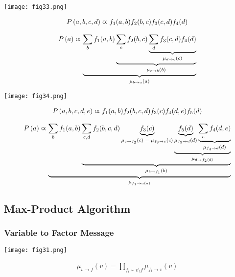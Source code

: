 \begin{minipage}{0.4\textwidth}
	\centering
	\texttt{[image: fig33.png]}
\end{minipage}
\begin{minipage}{0.6\textwidth}
	\begin{align*}
	P\left(a,b,c,d\right)\varpropto f_1(a,b)f_2(b,c)f_3(c,d)f_4(d)
	\end{align*}
\end{minipage}

\begin{align*}
P\left(a\right)\varpropto\underbrace{\sum_bf_1(a,b)\underbrace{\sum_cf_2(b,c)\underbrace{\sum_df_3(c,d)f_4(d)}_\text{$\mu_{d\to c}(c)$}}_\text{$\mu_{c\to b}(b)$}}_\text{$\mu_{b\to a}(a)$}
\end{align*}

\begin{minipage}{0.4\textwidth}
	\centering
	\texttt{[image: fig34.png]}
\end{minipage}
\begin{minipage}{0.6\textwidth}
	\begin{align*}
	P\left(a,b,c,d,e\right)\varpropto f_1(a,b)f_2(b,c,d)f_3(c)f_4(d,e)f_5(d)
	\end{align*}
\end{minipage}

\begin{align*}
P\left(a\right)\varpropto\underbrace{\sum_bf_1(a,b)\underbrace{\sum_{c,d}f_2(b,c,d)\underbrace{f_3(c)}_\text{$\mu_{c\to f_2}(c)=\mu_{f_3\to c}(c)$}\underbrace{\underbrace{f_5(d)}_\text{$\mu_{f_5\to d}(d)$}\underbrace{\sum_ef_4(d,e)}_\text{$\mu_{f_4\to d}(d)$}}_\text{$\mu_{d\to f_2(d)}$}}_\text{$\mu_{b\to f_1}(b)$}}_\text{$\mu_{f_1\to a(a)}$}
\end{align*}

\subsection{Max-Product Algorithm}

\subsubsection*{Variable to Factor Message}

\begin{minipage}{0.4\textwidth}
	\centering
	\texttt{[image: fig31.png]}
\end{minipage}
\begin{minipage}{0.6\textwidth}
	\begin{align*}
	\mu_{v\to f}(v)=\prod_{f_i\sim v\setminus f}\mu_{f_i\to v}(v)
	\end{align*}
\end{minipage}

